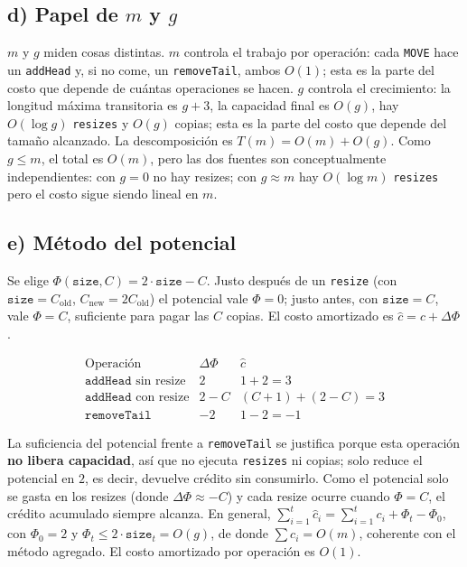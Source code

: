 \documentclass[11pt,a4paper]{article}
\begin{document}
\subsection*{d) Papel de $m$ y $g$}

$m$ y $g$ miden cosas distintas. $m$ controla el trabajo por operación: cada \texttt{MOVE} hace un \texttt{addHead} y, si no come, un \texttt{removeTail}, ambos $O(1)$; esta es la parte del costo que depende de cuántas operaciones se hacen. $g$ controla el crecimiento: la longitud máxima transitoria es $g+3$, la capacidad final es $O(g)$, hay $O(\log g)$ \texttt{resizes} y $O(g)$ copias; esta es la parte del costo que depende del tamaño alcanzado. La descomposición es $T(m) = O(m) + O(g)$. Como $g \le m$, el total es $O(m)$, pero las dos fuentes son conceptualmente independientes: con $g = 0$ no hay resizes; con $g \approx m$ hay $O(\log m)$ \texttt{resizes} pero el costo sigue siendo lineal en $m$.

\subsection*{e) Método del potencial}

Se elige $\Phi(\texttt{size}, C) = 2\cdot\texttt{size} - C$. Justo después de un \texttt{resize} (con $\texttt{size} = C_{\text{old}}$, $C_{\text{new}} = 2C_{\text{old}}$) el potencial vale $\Phi = 0$; justo antes, con $\texttt{size} = C$, vale $\Phi = C$, suficiente para pagar las $C$ copias. El costo amortizado es $\hat{c} = c + \Delta\Phi$.

\[
\begin{array}{c|c|c}
\text{Operación}&\Delta\Phi&\hat c\\ \hline
\texttt{addHead} \text{ sin resize}&2&1+2=3\\
\texttt{addHead} \text{ con resize}&2-C&(C+1)+(2-C)=3\\
\texttt{removeTail}&-2&1-2=-1
\end{array}
\]

La suficiencia del potencial frente a \texttt{removeTail} se justifica porque esta operación \textbf{no libera capacidad}, así que no ejecuta \texttt{resizes} ni copias; solo reduce el potencial en $2$, es decir, devuelve crédito sin consumirlo. Como el potencial solo se gasta en los resizes (donde $\Delta\Phi \approx -C$) y cada resize ocurre cuando $\Phi = C$, el crédito acumulado siempre alcanza. En general, $\sum_{i=1}^{t} \hat{c}_i = \sum_{i=1}^{t} c_i + \Phi_t - \Phi_0$, con $\Phi_0 = 2$ y $\Phi_t \le 2\cdot\texttt{size}_t = O(g)$, de donde $\sum c_i = O(m)$, coherente con el método agregado. El costo amortizado por operación es $O(1)$.
\end{document}
